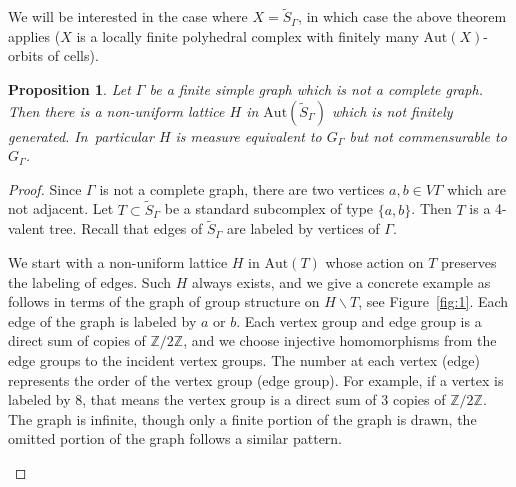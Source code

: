 \documentclass[JEP,XML,SOM,Unicode,NoFloatCountersInSection,published]{cedram}
\theoremstyle{plain}
\newtheorem{prop}[theo]{Proposition}
\theoremstyle{definition}
\newcommand{\Aut}{\mathrm{Aut}}
\begin{document}
We will be interested in the case where $X=\widetilde S_\Gamma$, in which case the above theorem applies (\ie $X$ is a locally finite polyhedral complex with finitely many $\Aut(X)$-orbits of cells).\enlargethispage{\baselineskip}%

\begin{prop}\label{prop:lattice}
Let $\Gamma$ be a finite simple graph which is not a complete graph. Then there is a non-uniform lattice $H$ in $\Aut(\widetilde S_\Gamma)$ which is not finitely generated. In~particular $H$ is measure equivalent to $G_\Gamma$ but not commensurable to $G_\Gamma$.
\end{prop}

\begin{proof}
Since $\Gamma$ is not a complete graph, there are two vertices $a,b\in V\Gamma$ which are not adjacent. Let $T\subset \widetilde S_\Gamma$ be a standard subcomplex of type $\{a,b\}$. Then $T$ is a 4-valent tree. Recall that edges of $\widetilde S_\Gamma$ are labeled by vertices of $\Gamma$.

We start with a non-uniform lattice $H$ in $\Aut(T)$ whose action on $T$ preserves the labeling of edges. Such $H$ always exists, and we give a concrete example as follows in terms of the graph of group structure on $H\backslash T$, see Figure~\ref{fig:1}. Each edge of the graph is labeled by $a$ or $b$. Each vertex group and edge group is a direct sum of copies of $\mathbb Z/2\mathbb Z$, and we choose injective homomorphisms from the edge groups to the incident vertex groups. The number at each vertex (\resp edge) represents the order of the vertex group (\resp edge group). For example, if a vertex is labeled by $8$, that means the vertex group is a direct sum of 3 copies of $\mathbb Z/2\mathbb Z$. The graph is infinite, though only a finite portion of the graph is drawn, the omitted portion of the graph follows a similar pattern.
\begin{figure}
\smaller\smaller
{}
\end{figure}
\end{proof}
\end{document}
